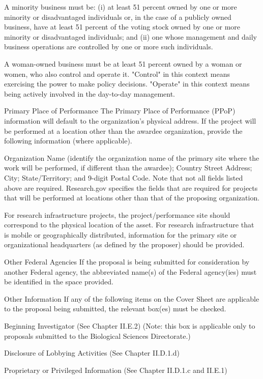 {A minority business must be: (i) at least 51 percent owned by one or more minority or disadvantaged individuals or, in the case of a publicly owned business, have at least 51 percent of the voting stock owned by one or more minority or disadvantaged individuals; and (ii) one whose management and daily business operations are controlled by one or more such individuals.

A woman-owned business must be at least 51 percent owned by a woman or women, who also control and operate it. "Control" in this context means exercising the power to make policy decisions. "Operate" in this context means being actively involved in the day-to-day management.

Primary Place of Performance
The Primary Place of Performance (PPoP) information will default to the organization’s physical address. If the project will be performed at a location other than the awardee organization, provide the following information (where applicable).

Organization Name (identify the organization name of the primary site where the work will be performed, if different than the awardee);
Country
Street Address;
City;
State/Territory; and
9-digit Postal Code.
Note that not all fields listed above are required. Research.gov specifies the fields that are required for projects that will be performed at locations other than that of the proposing organization.

For research infrastructure projects, the project/performance site should correspond to the physical location of the asset. For research infrastructure that is mobile or geographically distributed, information for the primary site or organizational headquarters (as defined by the proposer) should be provided.

Other Federal Agencies
If the proposal is being submitted for consideration by another Federal agency, the abbreviated name(s) of the Federal agency(ies) must be identified in the space provided.

Other Information
If any of the following items on the Cover Sheet are applicable to the proposal being submitted, the relevant box(es) must be checked.

Beginning Investigator (See Chapter II.E.2) (Note: this box is applicable only to proposals submitted to the Biological Sciences Directorate.)

Disclosure of Lobbying Activities (See Chapter II.D.1.d)

Proprietary or Privileged Information (See Chapter II.D.1.c and II.E.1)

}
